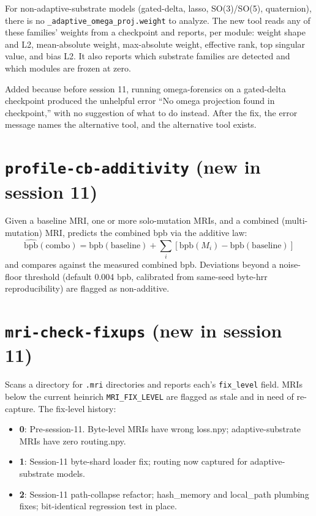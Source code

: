 \documentclass[11pt,openany]{book}
\begin{document}
For non-adaptive-substrate models (gated-delta, lasso, SO(3)/SO(5),
quaternion), there is no \texttt{\_adaptive\_omega\_proj.weight} to
analyze. The new tool reads any of these families' weights from a
checkpoint and reports, per module: weight shape and L2, mean-absolute
weight, max-absolute weight, effective rank, top singular value, and
bias L2. It also reports which substrate families are detected and
which modules are frozen at zero.

Added because before session 11, running omega-forensics on a
gated-delta checkpoint produced the unhelpful error ``No omega
projection found in checkpoint,'' with no suggestion of what to do
instead. After the fix, the error message names the alternative tool,
and the alternative tool exists.

\section{\texttt{profile-cb-additivity} (new in session 11)}

Given a baseline MRI, one or more solo-mutation MRIs, and a combined
(multi-mutation) MRI, predicts the combined bpb via the additive law:
\[
\hat{\mathrm{bpb}}(\mathrm{combo}) = \mathrm{bpb}(\mathrm{baseline}) +
\sum_i [\mathrm{bpb}(M_i) - \mathrm{bpb}(\mathrm{baseline})]
\]
and compares against the measured combined bpb. Deviations beyond a
noise-floor threshold (default 0.004 bpb, calibrated from same-seed
byte-hrr reproducibility) are flagged as non-additive.

\section{\texttt{mri-check-fixups} (new in session 11)}

Scans a directory for \texttt{.mri} directories and reports each's
\texttt{fix\_level} field. MRIs below the current heinrich
\texttt{MRI\_FIX\_LEVEL} are flagged as stale and in need of re-capture.
The fix-level history:

\begin{itemize}
  \item \textbf{0}: Pre-session-11. Byte-level MRIs have wrong
  loss.npy; adaptive-substrate MRIs have zero routing.npy.
  \item \textbf{1}: Session-11 byte-shard loader fix; routing now
  captured for adaptive-substrate models.
  \item \textbf{2}: Session-11 path-collapse refactor; hash\_memory
  and local\_path plumbing fixes; bit-identical regression test in
  place.
\end{itemize}
\end{document}
